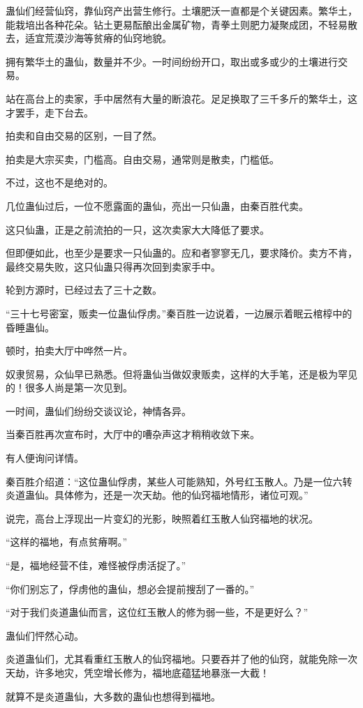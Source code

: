 \begin{this_body}
蛊仙们经营仙窍，靠仙窍产出营生修行。土壤肥沃一直都是个关键因素。繁华土，能栽培出各种花朵。钻土更易酝酿出金属矿物，青拳土则肥力凝聚成团，不轻易散去，适宜荒漠沙海等贫瘠的仙窍地貌。

拥有繁华土的蛊仙，数量并不少。一时间纷纷开口，取出或多或少的土壤进行交易。

站在高台上的卖家，手中居然有大量的断浪花。足足换取了三千多斤的繁华土，这才罢手，走下台去。

拍卖和自由交易的区别，一目了然。

拍卖是大宗买卖，门槛高。自由交易，通常则是散卖，门槛低。

不过，这也不是绝对的。

几位蛊仙过后，一位不愿露面的蛊仙，亮出一只仙蛊，由秦百胜代卖。

这只仙蛊，正是之前流拍的一只，这次卖家大大降低了要求。

但即便如此，也至少是要求一只仙蛊的。应和者寥寥无几，要求降价。卖方不肯，最终交易失败，这只仙蛊只得再次回到卖家手中。

轮到方源时，已经过去了三十之数。

“三十七号密室，贩卖一位蛊仙俘虏。”秦百胜一边说着，一边展示着眠云棺椁中的昏睡蛊仙。

顿时，拍卖大厅中哗然一片。

奴隶贸易，众仙早已熟悉。但将蛊仙当做奴隶贩卖，这样的大手笔，还是极为罕见的！很多人尚是第一次见到。

一时间，蛊仙们纷纷交谈议论，神情各异。

当秦百胜再次宣布时，大厅中的嘈杂声这才稍稍收敛下来。

有人便询问详情。

秦百胜介绍道：“这位蛊仙俘虏，某些人可能熟知，外号红玉散人。乃是一位六转炎道蛊仙。具体修为，还是一次天劫。他的仙窍福地情形，诸位可观。”

说完，高台上浮现出一片变幻的光影，映照着红玉散人仙窍福地的状况。

“这样的福地，有点贫瘠啊。”

“是，福地经营不佳，难怪被俘虏活捉了。”

“你们别忘了，俘虏他的蛊仙，想必会提前搜刮了一番的。”

“对于我们炎道蛊仙而言，这位红玉散人的修为弱一些，不是更好么？”

蛊仙们怦然心动。

炎道蛊仙们，尤其看重红玉散人的仙窍福地。只要吞并了他的仙窍，就能免除一次天劫，许多地灾，凭空增长修为，福地底蕴猛地暴涨一大截！

就算不是炎道蛊仙，大多数的蛊仙也想得到福地。


\end{this_body}
